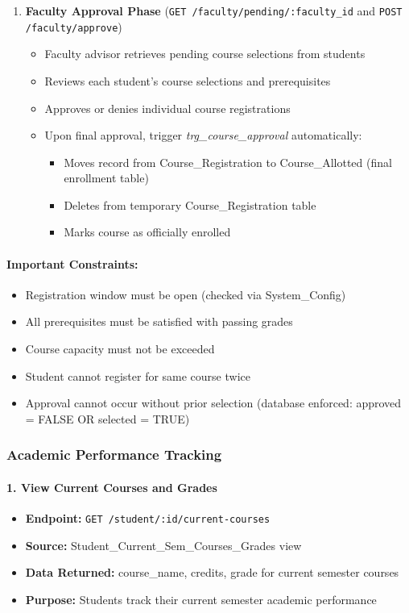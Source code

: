 \documentclass[12pt]{article}
\begin{document}
\begin{enumerate}
    \item \textbf{Faculty Approval Phase} (\texttt{GET /faculty/pending/:faculty\_id} and \texttt{POST /faculty/approve})
        \begin{itemize}
            \item Faculty advisor retrieves pending course selections from students
            \item Reviews each student's course selections and prerequisites
            \item Approves or denies individual course registrations
            \item Upon final approval, trigger \textit{trg\_course\_approval} automatically:
                \begin{itemize}
                    \item Moves record from Course\_Registration to Course\_Allotted (final enrollment table)
                    \item Deletes from temporary Course\_Registration table
                    \item Marks course as officially enrolled
                \end{itemize}
        \end{itemize}
\end{enumerate}

\paragraph{Important Constraints:}
\begin{itemize}
    \item Registration window must be open (checked via System\_Config)
    \item All prerequisites must be satisfied with passing grades
    \item Course capacity must not be exceeded
    \item Student cannot register for same course twice
    \item Approval cannot occur without prior selection (database enforced: approved = FALSE OR selected = TRUE)
\end{itemize}

\subsubsection{Academic Performance Tracking}

\paragraph{1. View Current Courses and Grades}
\begin{itemize}
    \item \textbf{Endpoint:} \texttt{GET /student/:id/current-courses}
    \item \textbf{Source:} Student\_Current\_Sem\_Courses\_Grades view
    \item \textbf{Data Returned:} course\_name, credits, grade for current semester courses
    \item \textbf{Purpose:} Students track their current semester academic performance
\end{itemize}
\end{document}
